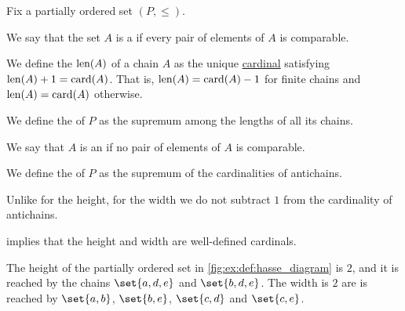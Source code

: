 \begin{definition}\label{def:partial_order_chain}
  Fix a partially ordered set \( (P, \leq) \).

  \begin{thmenum}
     We say that the set \( A \) is a  if every pair of elements of \( A \) is comparable.

     We define the  \( \operatorname{len}(A) \) of a chain \( A \) as the unique \hyperref[def:cardinal]{cardinal} satisfying \( \operatorname{len}(A) + 1 = \operatorname{card}(A) \). That is, \( \operatorname{len}(A) = \operatorname{card}(A) - 1 \) for finite chains and \( \operatorname{len}(A) = \operatorname{card}(A) \) otherwise.

     We define the  of \( P \) as the supremum among the lengths of all its chains.

     We say that \( A \) is an  if no pair of elements of \( A \) is comparable.

     We define the  of \( P \) as the supremum of the cardinalities of antichains.
  \end{thmenum}
\end{definition}
\begin{comments}
  \item Unlike for the height, for the width we do not subtract \( 1 \) from the cardinality of antichains.
  \item {} implies that the height and width are well-defined cardinals.
\end{comments}

\begin{example}\label{ex:def:partial_order_chain}
  The height of the partially ordered set in \cref{fig:ex:def:hasse_diagram} is \( 2 \), and it is reached by the chains \( \set{ a, d, e } \) and \( \set{ b, d, e } \). The width is \( 2 \) are is reached by \( \set{ a, b } \), \( \set{ b, e } \), \( \set{ c, d } \) and \( \set{ c, e } \).
\end{example}

